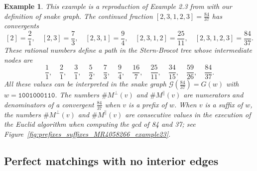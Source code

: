 \documentclass[a4paper,12pt]{amsart}
\newtheorem{example}[definition]{Example}
\newcommand{\Gcal}{{\mathcal{G}}}
\newcommand{\0}{\mathtt{0}}
\newcommand{\1}{\mathtt{1}}
\newcommand{\2}{\mathtt{2}}
\newcommand{\3}{\mathtt{3}}
\newcommand{\carreplein}{{\perp}}
\newcommand{\carrevide}{{\parallel}}
\begin{document}
\begin{example}
    This example is a reproduction of Example 2.3 from \cite{MR4058266}
    with our definition of snake graph.
    The continued fraction
    $[2, 3, 1, 2, 3]=\frac{84}{37}$ has convergents
    \[
        [2]=\frac{2}{1},\quad
        [2, 3]=\frac{7}{3},\quad
        [2, 3, 1]=\frac{9}{4},\quad
        [2, 3, 1, 2]=\frac{25}{11},\quad
        [2, 3, 1, 2, 3]=\frac{84}{37}.
    \]
    These rational numbers define a path in the Stern-Brocot tree
    \cite{MR1397498}
    whose intermediate nodes are
    \[
        \frac{1}{1},\quad
        \frac{2}{1},\quad
        \frac{3}{1},\quad
        \frac{5}{2},\quad
        \frac{7}{3},\quad
        \frac{9}{4},\quad
        \frac{16}{7},\quad
        \frac{25}{11},\quad
        \frac{34}{15},\quad
        \frac{59}{26},\quad
        \frac{84}{37}.
    \]
    All these values can be interpreted in the
    snake graph $\Gcal(\frac{84}{37})=G(w)$
    with $w=\1\0\0\1\0\0\0\1\1\0$.
    The numbers $\#M^\carreplein(v)$
    and $\#M^\carrevide(v)$ are numerators and denominators of
    a convergent $\frac{84}{37}$ when $v$ is a prefix of $w$.
    When $v$ is a suffix of $w$,
    the numbers $\#M^\carreplein(v)$
    and $\#M^\carrevide(v)$ are consecutive values in
    the execution of the Euclid algorithm when computing the gcd of 84 and 37;
    see Figure~\ref{fig:prefixes_suffixes_MR4058266_example23}.
\end{example}


%
%
%
%
%
%
%



%
%
%

\subsection*{Perfect matchings with no interior edges}
\end{document}
